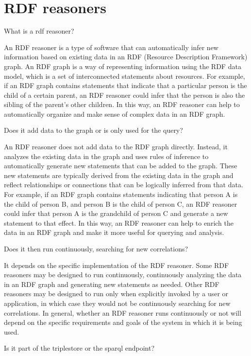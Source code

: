\section*{RDF reasoners}
\begin{description}
	\me What is a rdf reasoner?

	\gpt An RDF reasoner is a type of software that can automatically infer new information based on existing data in an RDF (Resource Description Framework) graph. An RDF graph is a way of representing information using the RDF data model, which is a set of interconnected statements about resources. For example, if an RDF graph contains statements that indicate that a particular person is the child of a certain parent, an RDF reasoner could infer that the person is also the sibling of the parent's other children. In this way, an RDF reasoner can help to automatically organize and make sense of complex data in an RDF graph.

	\me Does it add data to the graph or is only used for the query?

	\gpt An RDF reasoner does not add data to the RDF graph directly. Instead, it analyzes the existing data in the graph and uses rules of inference to automatically generate new statements that can be added to the graph. These new statements are typically derived from the existing data in the graph and reflect relationships or connections that can be logically inferred from that data. For example, if an RDF graph contains statements indicating that person A is the child of person B, and person B is the child of person C, an RDF reasoner could infer that person A is the grandchild of person C and generate a new statement to that effect. In this way, an RDF reasoner can help to enrich the data in an RDF graph and make it more useful for querying and analysis.

	\me Does it then run continuously, searching for new correlations?

	\gpt It depends on the specific implementation of the RDF reasoner. Some RDF reasoners may be designed to run continuously, continuously analyzing the data in an RDF graph and generating new statements as needed. Other RDF reasoners may be designed to run only when explicitly invoked by a user or application, in which case they would not be continuously searching for new correlations. In general, whether an RDF reasoner runs continuously or not will depend on the specific requirements and goals of the system in which it is being used.

	\me Is it part of the triplestore or the sparql endpoint?


\end{description}
